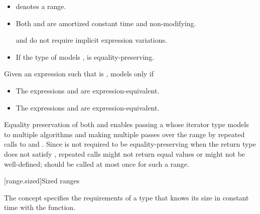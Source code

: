 \begin{addedblock}
\begin{itemdescr}
\begin{itemize}
\item {} denotes a range.

\item Both
and
are amortized constant time and non-modifying.
\begin{note}
and
do not require implicit expression
variations.
\end{note}

\item If the type of  models
,  is equality-preserving.
\end{itemize}

\pnum
Given an expression  such that  is ,
 models  only if
\begin{itemize}
\item The expressions  and 
are expression-equivalent.

\item The expressions  and 
are expression-equivalent.
\end{itemize}
\end{itemdescr}

\pnum
\begin{note}
Equality preservation of both  and
 enables passing a  whose iterator
type models  to multiple
algorithms and making multiple passes over the range by repeated calls to
 and .
Since  is not required to be equality-preserving
when the return type does not satisfy , repeated calls
might not return equal values or might not be well-defined;
 should be called at most once for such a range.
\end{note}

[range.sized]{Sized ranges}

\pnum
The  concept specifies the requirements
of a  type that knows its size in constant time with the
 function.


\end{addedblock}
